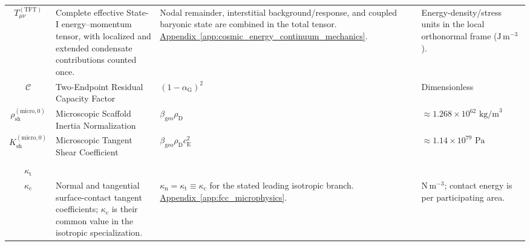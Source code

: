 \begin{longtable}{@{} c p{5.5cm} p{4cm} p{3.5cm} @{}}
$T_{\mu\nu}^{(\mathrm{TFT})}$ & {\raggedright Complete effective State-I energy--momentum tensor, with localized and extended condensate contributions counted once.\par} & {\raggedright Nodal remainder, interstitial background/response, and coupled baryonic state are combined in the total tensor. \newline \hyperref[app:cosmic_energy_continuum_mechanics]{Appendix~\ref*{app:cosmic_energy_continuum_mechanics}}.\par} & {\raggedright Energy-density/stress units in the local orthonormal frame ($\mathrm{J\,m^{-3}}$).\par} \\



$\mathcal{C}$ & Two-Endpoint Residual Capacity Factor & $(1 - \alpha_{\mathrm{G}})^2$ & Dimensionless \\

$\rho_{\mathrm{sh}}^{(\mathrm{micro},0)}$ & Microscopic Scaffold Inertia Normalization & $\beta_{\mathrm{geo}}\rho_{\mathrm{D}}$ & $\approx 1.268 \times 10^{62} \text{ kg/m}^3$ \\

$K_{\mathrm{sh}}^{(\mathrm{micro},0)}$ & Microscopic Tangent Shear Coefficient & $\beta_{\mathrm{geo}}\rho_{\mathrm{D}}c_{\mathrm{E}}^2$ & $\approx 1.14 \times 10^{79} \text{ Pa}$ \\

\begin{tabular}[c]{@{}c@{}}$\kappa_{\mathrm n}$ \\ $\kappa_{\mathrm t}$ \\ $\kappa_{\mathrm c}$\end{tabular} & {\raggedright Normal and tangential surface-contact tangent coefficients; $\kappa_{\mathrm c}$ is their common value in the isotropic specialization.\par} & {\raggedright $\kappa_{\mathrm n}=\kappa_{\mathrm t}\equiv\kappa_{\mathrm c}$ for the stated leading isotropic branch. \newline \hyperref[app:fcc_microphysics]{Appendix~\ref*{app:fcc_microphysics}}.\par} & {\raggedright $\mathrm{N\,m^{-3}}$; contact energy is per participating area.\par} \\


\end{longtable}
